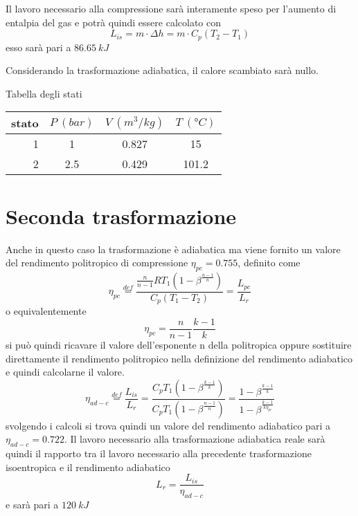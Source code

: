 \documentclass[a4paper,12pt]{article}
\begin{document}
Il lavoro necessario alla compressione sarà interamente speso per l'aumento di entalpia del gas
e potrà quindi essere calcolato con
\begin{equation}
    L_{is} = m\cdot \Delta h = m\cdot C_p (T_2 - T_1)
\end{equation}
esso sarà pari a $86.65\ kJ$

Considerando la trasformazione adiabatica, il calore scambiato sarà nullo.

Tabella degli stati

\begin{center}
\begin{tabular}{r|c|c|c}
    stato    & $P\ (bar)$ & $V\ (m^3/kg)$ & $T\ (\text{°}C) $\\ \hline
    1   &           1 &          0.827    &           15     \\ \hline
    2   &         2.5 &          0.429    &           101.2
\end{tabular}
\end{center}

\section{Seconda trasformazione}
\label{sec:seconda_trasformazione}
Anche in questo caso la trasformazione è adiabatica ma viene fornito un valore del rendimento
politropico di compressione $\eta_{pc} = 0.755$, definito come
\begin{equation}
    \eta_{pc} \stackrel{def}{=} \frac{\displaystyle\frac{n}{n-1} R T_1 \left(1-\beta^{\displaystyle\frac{n-1}{n}} \right)}{C_p \left(T_1 - T_2\right)}
    = \frac{L_{pc}}{L_r}
\end{equation}
o equivalentemente 
\begin{equation}
    \eta_{pc} = \frac{n}{n-1} \frac{k-1}{k}
\end{equation}
si può quindi ricavare il valore dell'esponente n della politropica oppure sostituire direttamente
il rendimento politropico nella definizione del rendimento adiabatico e quindi calcolarne il valore.
\begin{equation}
    \label{eq:rendimento_compressione_adiabatico}
    \eta_{ad-c} \stackrel{def}{=} \frac{L_{is}}{L_r} = \frac{ C_p T_1 \left(1-\beta^{\displaystyle\frac{k-1}{k}}\right)}
    {C_p T_1 \left(1-\beta^{\displaystyle\frac{n-1}{n}}\right)} = \frac{1-\beta^{\displaystyle\frac{k-1}{k}}}{1-\beta^{\displaystyle\frac{k-1}{k\eta_{pc}}}}
\end{equation}
svolgendo i calcoli si trova quindi un valore del rendimento adiabatico pari a $\eta_{ad-c}=0.722$.
Il lavoro necessario alla trasformazione adiabatica reale sarà quindi il rapporto tra il lavoro necessario
alla precedente trasformazione isoentropica e il rendimento adiabatico
\begin{equation*}
    L_r = \frac{L_{is}}{\eta_{ad-c}}
\end{equation*}
e sarà pari a $120\ kJ$
\end{document}
